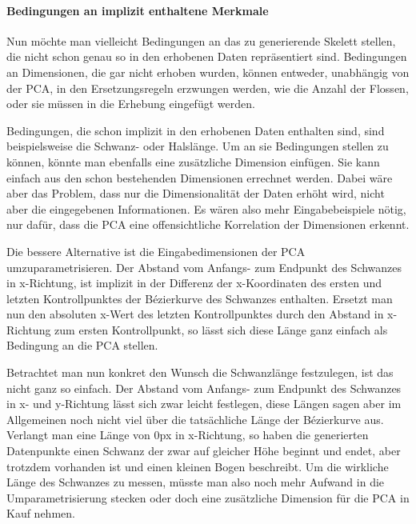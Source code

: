 \paragraph{Bedingungen an implizit enthaltene Merkmale}
 Nun möchte man vielleicht Bedingungen an das zu generierende Skelett stellen, die nicht schon genau so in den erhobenen Daten repräsentiert sind. 
 Bedingungen an Dimensionen, die gar nicht erhoben wurden, können  entweder, unabhängig von der PCA, in den Ersetzungsregeln erzwungen werden, wie \zb die Anzahl der Flossen, oder sie müssen in die Erhebung eingefügt werden.
 
 Bedingungen, die schon implizit in den erhobenen Daten enthalten sind, sind beispielsweise die Schwanz- oder Halslänge. Um an sie Bedingungen stellen zu können, könnte man ebenfalls eine zusätzliche Dimension einfügen. Sie kann einfach aus den schon bestehenden Dimensionen errechnet werden. Dabei wäre aber das Problem, dass nur die Dimensionalität der Daten erhöht wird, nicht aber die eingegebenen Informationen. Es wären also mehr Eingabebeispiele nötig, nur dafür, dass die PCA eine offensichtliche Korrelation der Dimensionen erkennt.
 
 Die bessere Alternative ist die Eingabedimensionen der PCA umzuparametrisieren. Der Abstand vom Anfangs- zum Endpunkt des Schwanzes in x-Richtung, ist \zb implizit in der Differenz der x-Koordinaten des ersten und letzten Kontrollpunktes der Bézierkurve des Schwanzes enthalten. Ersetzt man nun den absoluten x-Wert des letzten Kontrollpunktes durch den Abstand in x-Richtung zum ersten Kontrollpunkt, so lässt sich diese Länge ganz einfach als Bedingung an die PCA stellen. 
 
 Betrachtet man nun konkret den Wunsch die Schwanzlänge festzulegen, ist das nicht ganz so einfach. Der Abstand vom Anfangs- zum Endpunkt des Schwanzes in x- und y-Richtung lässt sich zwar leicht festlegen, diese Längen sagen aber im Allgemeinen noch nicht viel über die tatsächliche Länge der Bézierkurve aus. Verlangt man \zb eine Länge von $0$px in x-Richtung, so haben die generierten Datenpunkte einen Schwanz der zwar auf gleicher Höhe beginnt und endet, aber trotzdem vorhanden ist und einen kleinen Bogen beschreibt.
 Um die wirkliche Länge des Schwanzes zu messen, müsste man also noch mehr Aufwand in die Umparametrisierung stecken oder doch eine zusätzliche Dimension für die PCA in Kauf nehmen.
 
 
